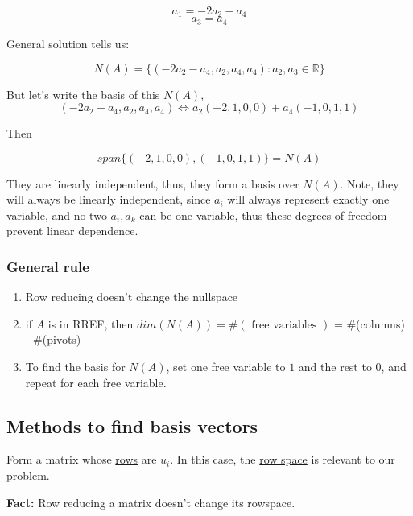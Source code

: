\documentclass{article}
\newtheorem{one minute paper}[theorem]{One Minute Paper}
\begin{document}
\begin{equation}
    a_1 = -2a_2 - a_4
\end{equation}
\begin{equation}
    a_3 = a_4
\end{equation}

General solution tells us:

\begin{equation}
    N(A) = \{(-2a_2-a_4, a_2, a_4, a_4) : a_2, a_3 \in \mathbb{R}\}
\end{equation}

But let's write the basis of this $N(A)$,
\begin{equation}
    (-2a_2-a_4, a_2, a_4, a_4) \iff a_2(-2,1,0,0) + a_4(-1,0,1,1)
\end{equation}

Then

\begin{equation}
    span\{(-2,1,0,0), (-1,0,1,1)\} = N(A)
\end{equation}

They are linearly independent, thus, they form a basis over $N(A)$. Note, they will always be linearly independent, since $a_i$ will always represent 
exactly one variable, and no two $a_i,a_k$ can be one variable, thus these degrees of freedom prevent linear dependence. 

\subsubsection*{General rule}

\begin{enumerate}
    \item Row reducing doesn't change the nullspace
    \item if $A$ is in RREF, then $dim(N(A)) = \#(\text{ free variables })$ = \#(columns) - \#(pivots)
    \item To find the basis for $N(A)$, set one free variable to $1$ and the rest to 0, and repeat for each free variable. 
\end{enumerate}

\subsection*{Methods to find basis vectors}

Form a matrix whose \underline{rows} are $u_i$. In this case, the \underline{row space} is relevant to our problem. 

\textbf{Fact:} Row reducing a matrix doesn't change its rowspace. 
\end{document}
